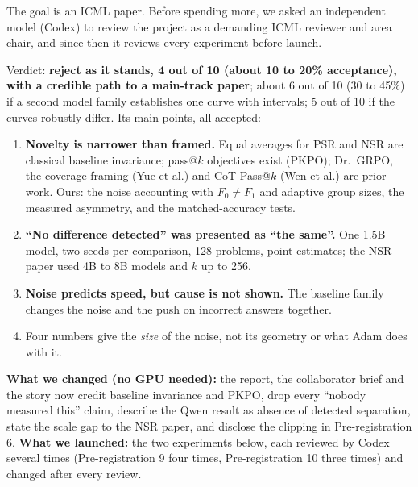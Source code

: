 \documentclass[11pt]{article}
\begin{document}
\begin{why}
The goal is an ICML paper. Before spending more, we asked an independent model (Codex) to review the project as a demanding ICML reviewer and area chair, and since then it reviews every experiment before launch.
\end{why}
\begin{found}
Verdict: \textbf{reject as it stands, 4 out of 10 (about 10 to 20\% acceptance), with a credible path to a main-track paper}; about 6 out of 10 (30 to 45\%) if a second model family establishes one curve with intervals; 5 out of 10 if the curves robustly differ. Its main points, all accepted:
\begin{enumerate}[leftmargin=*,itemsep=1pt]
\item \textbf{Novelty is narrower than framed.} Equal averages for PSR and NSR are classical baseline invariance; pass@$k$ objectives exist (PKPO); Dr.\ GRPO, the coverage framing (Yue et al.) and CoT-Pass@$k$ (Wen et al.) are prior work. Ours: the noise accounting with $F_0\neq F_1$ and adaptive group sizes, the measured asymmetry, and the matched-accuracy tests.
\item \textbf{``No difference detected'' was presented as ``the same''.} One 1.5B model, two seeds per comparison, 128 problems, point estimates; the NSR paper used 4B to 8B models and $k$ up to 256.
\item \textbf{Noise predicts speed, but cause is not shown.} The baseline family changes the noise and the push on incorrect answers together.
\item Four numbers give the \emph{size} of the noise, not its geometry or what Adam does with it.
\end{enumerate}
\end{found}
\textbf{What we changed (no GPU needed):} the report, the collaborator brief and the story now credit baseline invariance and PKPO, drop every ``nobody measured this'' claim, describe the Qwen result as absence of detected separation, state the scale gap to the NSR paper, and disclose the clipping in Pre-registration 6. \textbf{What we launched:} the two experiments below, each reviewed by Codex several times (Pre-registration 9 four times, Pre-registration 10 three times) and changed after every review.

\end{document}
